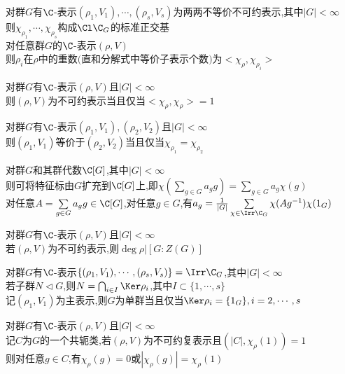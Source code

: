 \begin{dingli}
对群$G$有$\C$-表示$(\rho_1,V_1),\cdots,(\rho_s,V_s)$为两两不等价不可约表示,其中$|G|<\infty$\\
则$\chi_{\rho_1},\cdots,\chi_{\rho_s}$构成$\Cl \C_{G}$的标准正交基\\
对任意群$G$的$\C$-表示$(\rho,V)$\\
则$\rho_i$在$\rho$中的重数$($直和分解式中等价子表示个数$)$为$<\chi_{\rho},\chi_{\rho_i}>$
\end{dingli}

\begin{dingli}
对群$G$有$\C$-表示$(\rho,V)$且$|G|<\infty$\\
则$(\rho,V)$为不可约表示当且仅当$<\chi_{\rho},\chi_{\rho}>=1$
\end{dingli}

\begin{dingli}
对群$G$有$\C$-表示$(\rho_1,V_1),(\rho_2,V_2)$且$|G|<\infty$\\
则$(\rho_1,V_1)$等价于$(\rho_2,V_2)$当且仅当$\chi_{\rho_1}=\chi_{\rho_2}$
\end{dingli}

\begin{dingli}
对群$G$和其群代数$\C[G]$,其中$|G|<\infty$\\
则可将特征标由$G$扩充到$\C[G]$上,即$\chi(\sum\limits_{g\in G}a_g g)=\sum\limits_{g\in G}a_g \chi(g)$\\
对任意$A=\sum\limits_{g\in G}a_g g\in \C[G]$,对任意$g\in G$,有$a_g=\frac{1}{|G|}\sum\limits_{\chi\in \Irr\C_{G}}\chi(Ag^{-1})\chi(1_{G})$
\end{dingli}

\begin{dingli}
对群$G$有$\C$-表示$(\rho,V)$且$|G|<\infty$\\
若$(\rho,V)$为不可约表示,则$\deg \rho|[G:Z(G)]$
\end{dingli}

\begin{dingli}
对群$G$有$\C$-表示$\{(\rho_1,V_1),\cdots,(\rho_s,V_s)\}=\Irr\C_{G}$,其中$|G|<\infty$\\
若子群$N\lhd G$,则$N=\bigcap_{i\in I}\Ker \rho_{i}$,其中$I\subset \{1,\cdots,s\}$\\
记$(\rho_1,V_1)$为主表示,则$G$为单群当且仅当$\Ker \rho_{i}=\{1_{G}\},i=2,\cdots,s$
\end{dingli}

\begin{dingli}
对群$G$有$\C$-表示$(\rho,V)$且$|G|<\infty$\\
记$C$为$G$的一个共轭类,若$(\rho,V)$为不可约复表示且$(|C|,\chi_{\rho}(1))=1$\\
则对任意$g\in C$,有$\chi_{\rho}(g)=0$或$|\chi_{\rho}(g)|=\chi_{\rho}(1)$
\end{dingli}

